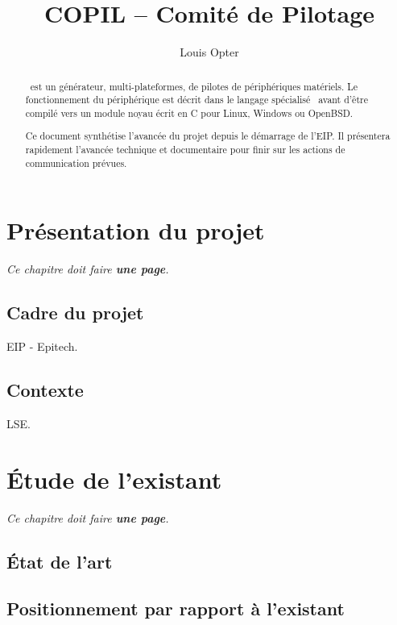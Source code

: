 \documentclass[francais]{rtxreport}
\author{Louis Opter}
\title{COPIL -- Comité de Pilotage}
\begin{document}
\maketitle

\begin{abstract}
\rtx\ est un générateur, multi-plateformes, de pilotes de périphériques
matériels. Le fonctionnement du périphérique est décrit dans le langage
spécialisé \rtx\ avant d'être compilé vers un module noyau écrit en C pour
Linux, Windows ou OpenBSD.

Ce document synthétise l'avancée du projet depuis le démarrage de l'EIP. Il
présentera rapidement l’avancée technique et documentaire pour finir sur les
actions de communication prévues.
\end{abstract}

\rtxmaketitleblock

\tableofcontents

\chapter{Présentation du projet}

\emph{Ce chapitre doit faire \textbf{une page}.}

\section{Cadre du projet}

EIP - Epitech.

\section{Contexte}

LSE.

\chapter{Étude de l'existant}

\emph{Ce chapitre doit faire \textbf{une page}.}

\section{État de l'art}

\section{Positionnement par rapport à l'existant}
\end{document}

